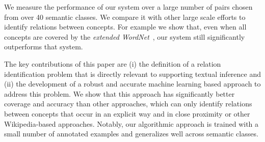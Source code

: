 We measure the performance of our system over a large number of
pairs chosen from over 40 semantic classes. We compare it with other
large scale efforts to identify relations between concepts. For
example we show that, even when all concepts are covered by the
{\em extended WordNet}~\cite{Snow2006}, our system still
significantly outperforms that system.
%

The key contributions of this paper are (i) the definition of a
relation identification problem that is directly relevant to
supporting textual inference and (ii) the development of a
robust and accurate machine learning based approach to address
this problem. We show that this approach has significantly
better coverage and accuracy than other approaches, which can
only identify relations between concepts that occur in an
explicit way and in close proximity or other Wikipedia-based
approaches. Notably, our algorithmic approach is trained with a
small number of annotated examples and generalizes well across
semantic classes.



